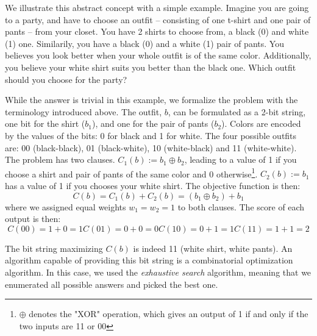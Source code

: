 We illustrate this abstract concept with a simple example. Imagine you are going to a party, and have to choose an outfit -- consisting of one t-shirt and one pair of pants -- from your closet. You have 2 shirts to choose from, a black (0) and white (1) one. Similarily, you have a black (0) and a white (1) pair of pants. You believes you look better when your whole outfit is of the same color. Additionally, you  believe your white shirt suits you better than the black one. Which outfit should you choose for the party? 

While the answer is trivial in this example, we formalize the problem with the terminology introduced above. The outfit, $b$, can be formulated as a 2-bit string, one bit for the shirt ($b_1$), and one for the pair of pants ($b_2$). Colors are encoded by the values of the bits: 0 for black and 1 for white. The four possible outfits are: 00 (black-black), 01 (black-white), 10 (white-black) and 11 (white-white). The problem has two clauses. $C_1(b) := b_1 \oplus b_2$, leading to a value of 1 if you choose a shirt and pair of pants of the same color and 0 otherwise\footnote{$\oplus$ denotes the "XOR" operation, which gives an output of 1 if and only if the two inputs are 11 or 00}. $C_2(b) := b_1$ has a value of 1 if you chooses your white shirt. The objective function is then:
\begin{equation}
    C(b) = C_1(b) + C_2(b) = (b_1 \oplus b_2) + b_1
\end{equation}
where we assigned equal weights $w_1 = w_2 = 1$ to both clauses.
The score of each output is then:
\begin{subequations}
\begin{equation}
     C(00) = 1 + 0 = 1
\end{equation}
\begin{equation}
    C(01) = 0 + 0 = 0
\end{equation}
   \begin{equation}
       C(10) = 0 +  1 = 1
   \end{equation}
   \begin{equation}
         C(11) = 1 + 1 = 2
   \end{equation}
\end{subequations}

The bit string maximizing $C(b)$ is indeed 11 (white shirt, white pants). An algorithm capable of providing this bit string is a combinatorial optimization algorithm. In this case, we used the \textit{exhaustive search} algorithm, meaning that we enumerated all possible answers and picked the best one. 

